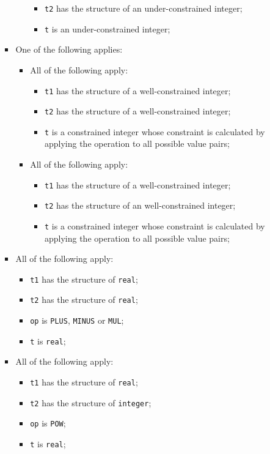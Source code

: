 \documentclass{book}
\begin{document}
\begin{itemize}
\begin{itemize}
\begin{itemize}
\begin{itemize}
\begin{itemize}
          \item \texttt{t2} has the structure of an under-constrained integer;
          \item \texttt{t} is an under-constrained integer;
          \end{itemize}
       \end{itemize}
      \item One of the following applies:
         \begin{itemize}
         \item All of the following apply:
           \begin{itemize}
           \item \texttt{t1} has the structure of a well-constrained integer;
           \item \texttt{t2} has the structure of a well-constrained integer;
	   \item \texttt{t} is a constrained integer whose constraint is calculated by
	     applying the operation to all possible value pairs;
           \end{itemize}
         \item All of the following apply:
           \begin{itemize}
           \item \texttt{t1} has the structure of a well-constrained integer;
           \item \texttt{t2} has the structure of an well-constrained integer;
	   \item \texttt{t} is a constrained integer whose constraint is calculated by
	     applying the operation to all possible value pairs;
           \end{itemize}
         \end{itemize}
      \item All of the following apply:
        \begin{itemize}
        \item \texttt{t1} has the structure of \texttt{real};
        \item \texttt{t2} has the structure of \texttt{real};
        \item \texttt{op} is \texttt{PLUS}, \texttt{MINUS} or \texttt{MUL};
        \item \texttt{t} is \texttt{real};
        \end{itemize}
     \item All of the following apply:
       \begin{itemize}
       \item \texttt{t1} has the structure of \texttt{real};
       \item \texttt{t2} has the structure of \texttt{integer};
       \item \texttt{op} is \texttt{POW};
       \item \texttt{t} is \texttt{real};
       \end{itemize}
     \end{itemize}
   \end{itemize} 


\end{itemize}
\end{document}
